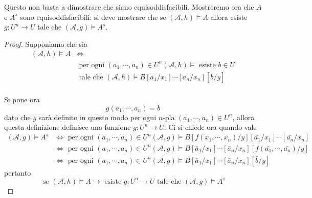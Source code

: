 Questo non basta a dimostrare che siano equisoddisfacibili. Mostreremo ora 
che $A$ e $A^s$ sono equisoddisfacibili: si deve mostrare che 
se $(\mathcal{A}, h) \models A$ allora esiste $g:U^n\rightarrow U$ tale che 
$(\mathcal{A}, g) \models A^s$. 
\begin{proof}
        Supponiamo che sia 
        \begin{align*}
                (\mathcal{A}, h) \models A &\iff \\
                                           &\text{ per ogni } (a_1, \cdots, a_n) \in U^n (\mathcal{A},h) \models \text{ esiste } b\in U\\
                                           &\text{ tale che } (\mathcal{A}, h) \models B[\bar{a_1}/x_1]\cdots[\bar{a_n}/x_n][\bar{b}/y] \\
        \end{align*}

        Si pone ora 
        $$
        g(a_1, \cdots, a_n) = b
        $$
        dato che $g$ sarà definito in questo modo per ogni $n$-pla $(a_1, \cdots, a_n) \in U^n$, 
        allora questa definizione definisce una funzione $g: U^n \rightarrow U$.
        Ci si chiede ora quando vale 
        \begin{align*}
                (\mathcal{A}, g) \models A^s &\iff \text{ per ogni } (a_1, \cdots, a_n) \in U^n (\mathcal{A}, g) \models B[f(x_1, \cdots, x_n)/y][\bar{a_1}/x_1]\cdots[\bar{a_n}/x_n] \\
                                             &\iff \text{ per ogni } (a_1, \cdots, a_n) \in U^n (\mathcal{A}, g) \models B[\bar{a}_1/x_1]\cdots[\bar{a}_n/x_n][f(\bar{a_1}, \cdots, \bar{a_n})/y] \\
                                             &\iff \text{ per ogni } (a_1, \cdots, a_n) \in U^n (\mathcal{A}, g) \models B[\bar{a}_1/x_1]\cdots[\bar{a}_n/x_n][\bar{b}/y]
        \end{align*}
        pertanto
        $$
                \text{ se }        (\mathcal{A}, h) \models A \rightarrow \text{ esiste } g: U^n \rightarrow U \text{ tale che } (\mathcal{A}, g) \models A^s 
        $$
\end{proof}

